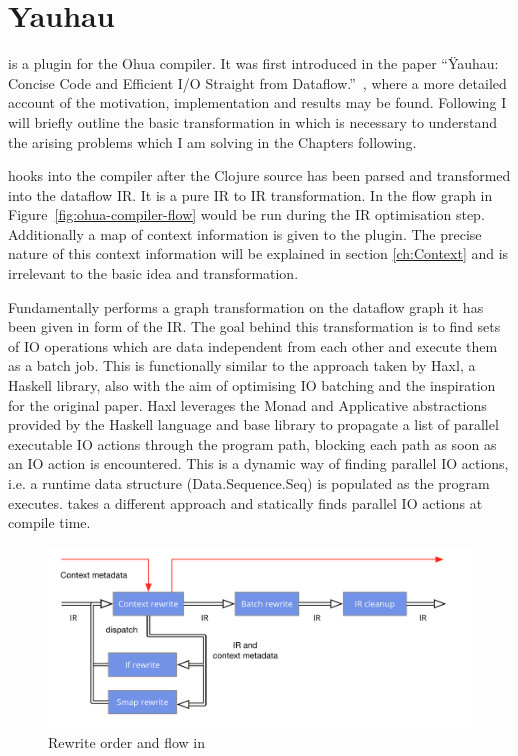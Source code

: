 \chapter{Yauhau}

\label{ch:Yauhau}

\yauhau{} is a plugin for the Ohua compiler.
It was first introduced in the paper ``Ÿauhau: Concise Code and Efficient I/O Straight from Dataflow.''~\cite{ErtelGoensAdamEtAl2016}, where a more detailed account of the motivation, implementation and results may be found.
Following I will briefly outline the basic transformation in \yauhau{} which is necessary to understand the arising problems which I am solving in the Chapters following.

\yauhau{} hooks into the compiler after the Clojure source has been parsed and transformed into the dataflow IR.
It is a pure IR to IR transformation.
In the flow graph in Figure~\ref{fig:ohua-compiler-flow} \yauhau{} would be run during the IR optimisation step.
Additionally a map of context information is given to the plugin.
The precise nature of this context information will be explained in section \ref{ch:Context} and is irrelevant to the basic \yauhau{} idea and transformation.

Fundamentally \yauhau{} performs a graph transformation on the dataflow graph it has been given in form of the IR.
The goal behind this transformation is to find sets of IO operations which are data independent from each other and execute them as a batch job.
This is functionally similar to the approach taken by Haxl\cite{Haxl:library:link}, a Haskell library, also with the aim of optimising IO batching and the inspiration for the original paper.
Haxl leverages the Monad and Applicative abstractions provided by the Haskell language and base library to propagate a list of parallel executable IO actions through the program path, blocking each path as soon as an IO action is encountered.
This is a dynamic way of finding parallel IO actions, i.e. a runtime data structure (Data.Sequence.Seq) is populated as the program executes.
\yauhau{} takes a different approach and statically finds parallel IO actions at compile time.

\begin{figure}
    \includegraphics[width=\linewidth]{../Figures/yauhau-rewrite-flow}
    \caption{Rewrite order and flow in \yauhau{}}
    \label{fig:yauhau-rewrite-flow}
\end{figure}

